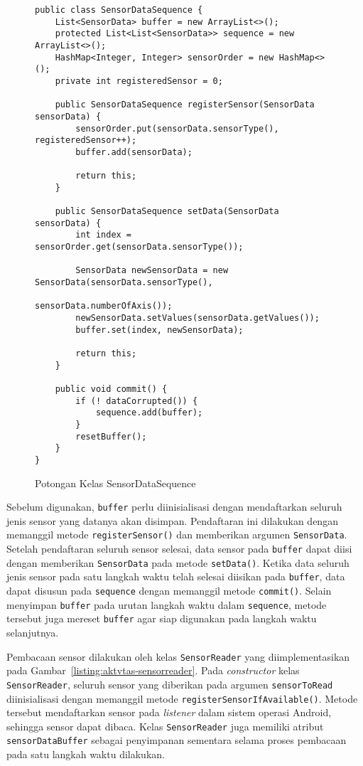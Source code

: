 \begin{figure}[h!]
\begin{verbatim}
public class SensorDataSequence {
    List<SensorData> buffer = new ArrayList<>();
    protected List<List<SensorData>> sequence = new ArrayList<>();
    HashMap<Integer, Integer> sensorOrder = new HashMap<>();
    private int registeredSensor = 0;
    
    public SensorDataSequence registerSensor(SensorData sensorData) {
        sensorOrder.put(sensorData.sensorType(), registeredSensor++);
        buffer.add(sensorData);

        return this;
    }

    public SensorDataSequence setData(SensorData sensorData) {
        int index = sensorOrder.get(sensorData.sensorType());

        SensorData newSensorData = new SensorData(sensorData.sensorType(),
                                                  sensorData.numberOfAxis());
        newSensorData.setValues(sensorData.getValues());
        buffer.set(index, newSensorData);

        return this;
    }

    public void commit() {
        if (! dataCorrupted()) {
            sequence.add(buffer);
        }
        resetBuffer();
    }
}
\end{verbatim}
\caption{Potongan Kelas SensorDataSequence}
\label{listing:aktvtas-sensordatasequence}
\end{figure}

Sebelum digunakan, \texttt{buffer} perlu diinisialisasi dengan mendaftarkan seluruh jenis sensor yang datanya akan disimpan. Pendaftaran ini dilakukan dengan memanggil metode \texttt{registerSensor()} dan memberikan argumen \texttt{SensorData}. Setelah pendaftaran seluruh sensor selesai, data sensor pada \texttt{buffer} dapat diisi dengan memberikan \texttt{SensorData} pada metode \texttt{setData()}. Ketika data seluruh jenis sensor pada satu langkah waktu telah selesai diisikan pada \texttt{buffer}, data dapat disusun pada \texttt{sequence} dengan memanggil metode \texttt{commit()}. Selain menyimpan  \texttt{buffer} pada urutan langkah waktu dalam \texttt{sequence}, metode tersebut juga mereset \texttt{buffer} agar siap digunakan pada langkah waktu selanjutnya.

Pembacaan sensor dilakukan oleh kelas \texttt{SensorReader} yang diimplementasikan pada Gambar~\ref{listing:aktvtas-sensorreader}. Pada \textit{constructor} kelas \texttt{SensorReader}, seluruh sensor yang diberikan pada argumen \texttt{sensorToRead} diinisialisasi dengan memanggil metode \texttt{registerSensorIfAvailable()}. Metode tersebut mendaftarkan sensor pada \textit{listener} dalam sistem operasi Android, sehingga sensor dapat dibaca. Kelas \texttt{SensorReader} juga memiliki atribut \texttt{sensorDataBuffer} sebagai penyimpanan sementara selama proses pembacaan pada satu langkah waktu dilakukan.


